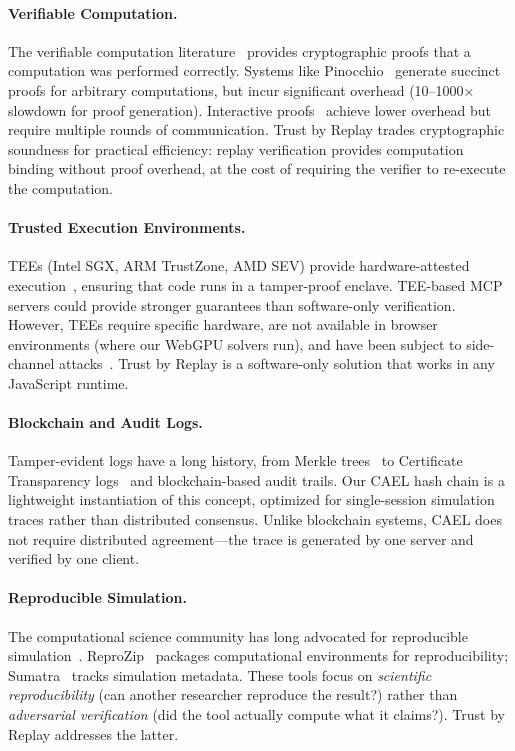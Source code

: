 \documentclass[letterpaper,twocolumn,10pt]{article}
\begin{document}
\paragraph{Verifiable Computation.} The verifiable computation
literature~\cite{gennaro2010,parno2012pinocchio} provides cryptographic
proofs that a computation was performed correctly. Systems like
Pinocchio~\cite{parno2012pinocchio} generate succinct proofs for arbitrary
computations, but incur significant overhead (10--1000$\times$ slowdown for
proof generation). Interactive proofs~\cite{goldwasser1989} achieve lower
overhead but require multiple rounds of communication. Trust by Replay
trades cryptographic soundness for practical efficiency: replay verification
provides computation binding without proof overhead, at the cost of requiring
the verifier to re-execute the computation.

\paragraph{Trusted Execution Environments.} TEEs (Intel SGX, ARM TrustZone,
AMD SEV) provide hardware-attested execution~\cite{costan2016sgx}, ensuring
that code runs in a tamper-proof enclave. TEE-based MCP servers could
provide stronger guarantees than software-only verification. However, TEEs
require specific hardware, are not available in browser environments (where
our WebGPU solvers run), and have been subject to side-channel
attacks~\cite{van2018foreshadow}. Trust by Replay is a software-only
solution that works in any JavaScript runtime.

\paragraph{Blockchain and Audit Logs.} Tamper-evident logs have a long
history, from Merkle trees~\cite{merkle1987} to Certificate Transparency
logs~\cite{laurie2014ct} and blockchain-based audit trails. Our CAEL hash
chain is a lightweight instantiation of this concept, optimized for
single-session simulation traces rather than distributed consensus. Unlike
blockchain systems, CAEL does not require distributed agreement---the trace
is generated by one server and verified by one client.

\paragraph{Reproducible Simulation.} The computational science community has
long advocated for reproducible simulation~\cite{peng2011,stodden2014}.
ReproZip~\cite{chirigati2016reprozip} packages computational environments for
reproducibility; Sumatra~\cite{davison2012sumatra} tracks simulation metadata.
These tools focus on \emph{scientific reproducibility} (can another researcher
reproduce the result?) rather than \emph{adversarial verification} (did the
tool actually compute what it claims?). Trust by Replay addresses the latter.
\end{document}
